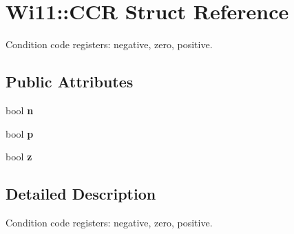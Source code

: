 \hypertarget{structWi11_1_1CCR}{
\section{Wi11::CCR Struct Reference}
\label{structWi11_1_1CCR}
}


Condition code registers: negative, zero, positive.  


\subsection*{Public Attributes}
\begin{DoxyCompactItemize}
\item 
\hypertarget{structWi11_1_1CCR_a7e9b9c393d64db1165ea6a8cd2e58dee}{
bool {\bfseries n}}
\label{structWi11_1_1CCR_a7e9b9c393d64db1165ea6a8cd2e58dee}

\item 
\hypertarget{structWi11_1_1CCR_add5febe92839418fdb0e54c0d94085b5}{
bool {\bfseries p}}
\label{structWi11_1_1CCR_add5febe92839418fdb0e54c0d94085b5}

\item 
\hypertarget{structWi11_1_1CCR_ad6f366ac578bd093ce61f20792ad2eb8}{
bool {\bfseries z}}
\label{structWi11_1_1CCR_ad6f366ac578bd093ce61f20792ad2eb8}

\end{DoxyCompactItemize}


\subsection{Detailed Description}
Condition code registers: negative, zero, positive. 